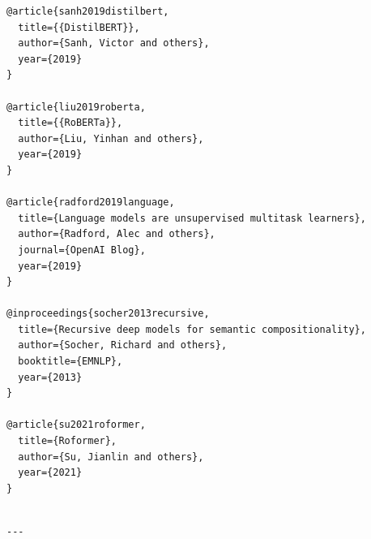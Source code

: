 \begin{lstlisting}
@article{sanh2019distilbert,
  title={{DistilBERT}},
  author={Sanh, Victor and others},
  year={2019}
}

@article{liu2019roberta,
  title={{RoBERTa}},
  author={Liu, Yinhan and others},
  year={2019}
}

@article{radford2019language,
  title={Language models are unsupervised multitask learners},
  author={Radford, Alec and others},
  journal={OpenAI Blog},
  year={2019}
}

@inproceedings{socher2013recursive,
  title={Recursive deep models for semantic compositionality},
  author={Socher, Richard and others},
  booktitle={EMNLP},
  year={2013}
}

@article{su2021roformer,
  title={Roformer},
  author={Su, Jianlin and others},
  year={2021}
}
\end{lstlisting}
\begin{lstlisting}

---
\end{lstlisting}